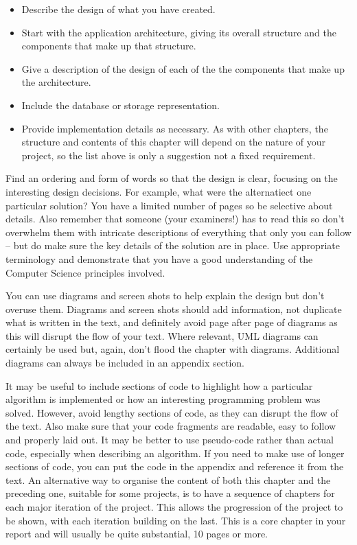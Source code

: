 
\begin{itemize}
\item Describe the design of what you have created.
\item Start with the application architecture, giving its overall structure and the components that make up that structure.
\item Give a description of the design of each of the the components that make up the architecture.
\item Include the database or storage representation.
\item Provide implementation details as necessary.
As with other chapters, the structure and contents of this chapter will depend on the nature of your project, so the list above is only a suggestion not a fixed requirement.
\end{itemize}


Find an ordering and form of words so that the design is clear, focusing on the interesting design decisions. For example, what were the alternatiect one particular solution? You have a limited number of pages so be selective about details. Also remember that someone (your examiners!) has to read this so don’t overwhelm them with intricate descriptions of everything that only you can follow – but do make sure the key details of the solution are in place. Use appropriate terminology and demonstrate that you have a good understanding of the Computer Science principles involved.

You can use diagrams and screen shots to help explain the design but don’t overuse them. Diagrams and screen shots should add information, not duplicate what is written in the text, and definitely avoid page after page of diagrams as this will disrupt the flow of your text. Where relevant, UML diagrams can certainly be used but, again, don’t flood the chapter with diagrams. Additional diagrams can always be included in an appendix section.

It may be useful to include sections of code to highlight how a particular algorithm is implemented or how an interesting programming problem was solved. However, avoid lengthy sections of code, as they can disrupt the flow of the text. Also make sure that your code fragments are readable, easy to follow and properly laid out. It may be better to use pseudo-code rather than actual code, especially when describing an algorithm. If you need to make use of longer sections of code, you can put the code in the appendix and reference it from the text.
An alternative way to organise the content of both this chapter and the preceding one, suitable for some projects, is to have a sequence of chapters for each major iteration of the project. This allows the progression of the project to be shown, with each iteration building on the last.
This is a core chapter in your report and will usually be quite substantial, 10 pages or more.

